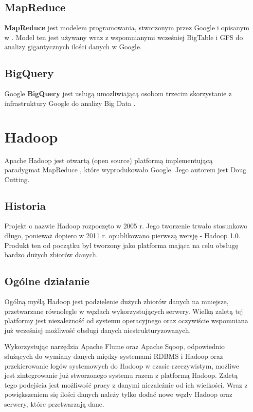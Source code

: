 \documentclass[10pt,twocolumn]{llncs}          %
\begin{document}
\subsection{MapReduce}
\label{ssub:mapreduce}
\textbf{MapReduce} jest modelem programowania, stworzonym przez Google i opisanym w \cite{dean08}. Model ten jest używany wraz z wspomnianymi wcześniej BigTable i GFS do analizy gigantycznych ilości danych w Google.

\subsection{BigQuery}
\label{ssub:bigquery}
Google \textbf{BigQuery} jest usługą umozliwiającą osobom trzecim skorzystanie z infrastruktury Google do analizy Big Data \cite{www:google-big-query}.

\section{Hadoop}
\label{ssub:hadoop}
Apache Hadoop jest otwartą (open source) platformą implementującą paradygmat MapReduce \cite{dean08}, które wyprodukowało Google. Jego autorem jest Doug Cutting.

\subsection{Historia}
\label{ssub:hadoop_historia}
Projekt o nazwie Hadoop rozpoczęto w 2005 r. Jego tworzenie trwało stosunkowo długo, ponieważ dopiero  w 2011 r. opublikowano pierwszą wersję - Hadoop 1.0. Produkt ten od początku był tworzony jako platforma mająca na celu obsługę bardzo dużych zbiorów danych. 

\subsection{Ogólne działanie}
\label{ssub:ogolne_dzialanie}
Ogólną myślą Hadoop jest podzielenie dużych zbiorów danych na mniejsze, przetwarzane równolegle w węzłach wykorzystujących serwery. Wielką zaletą tej platformy jest niezależność od systemu operacyjnego oraz oczywiście wspomniana już wcześniej możliwość obsługi danych niestrukturyzowanych.

Wykorzystując narzędzia Apache Flume oraz Apache Sqoop, odpowiednio służących do wymiany danych między systemami RDBMS i Hadoop oraz przekierowanie logów systemowych do Hadoop w czasie rzeczywistym, możliwe jest zintegrowanie już stworzonego systemu razem z platformą Hadoop. Zaletą tego podejścia jest możliwość pracy z danymi niezależnie od ich wielkości. Wraz z powiększeniem się ilości danych należy tylko dodać nowe węzły Hadoop oraz serwery, które przetwarzają dane.
\end{document}
